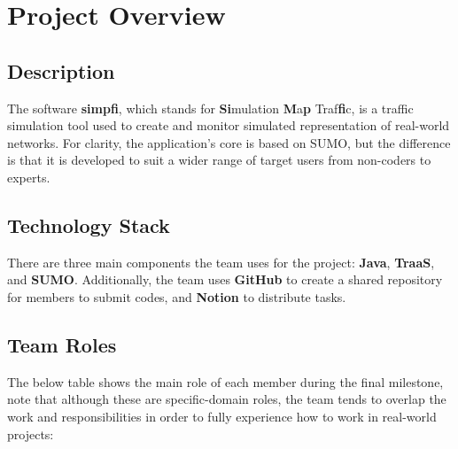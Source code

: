 \documentclass[a4paper, 12pt]{article}
\begin{document}
\section{Project Overview}
\subsection{Description}
The software \textbf{simpfi}, which stands for \textbf{Si}mulation \textbf{M}a\textbf{p} Traf\textbf{fi}c, is a traffic simulation tool used to create and monitor simulated representation of real-world networks. For clarity, the application's core is based on SUMO, but the difference is that it is developed to suit a wider range of target users from non-coders to experts.
\subsection{Technology Stack}
There are three main components the team uses for the project: \textbf{Java}, \textbf{TraaS}, and \textbf{SUMO}. \newline
Additionally, the team uses \textbf{GitHub} to create a shared repository for members to submit codes, and \textbf{Notion} to distribute tasks.
\subsection{Team Roles}
The below table shows the main role of each member during the final milestone, note that although these are specific-domain roles, the team tends to overlap the work and responsibilities in order to fully experience how to work in real-world projects:\newline
\begin{table}[h]
\centering
{}
\caption{Team Roles}
\end{table}
\end{document}
